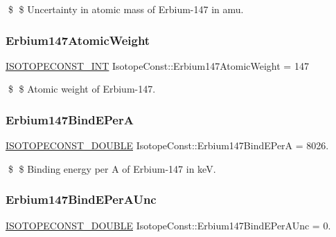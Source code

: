 \$ \$ Uncertainty in atomic mass of Erbium-\/147 in amu. \mbox{\label{group___isotope_const-_erbium-_er147_ga8aad24d3dfed998133d4e0a79999360c}} 
\subsubsection{\texorpdfstring{Erbium147\+Atomic\+Weight}{Erbium147AtomicWeight}}
{\footnotesize\ttfamily \mbox{\hyperlink{group___isotope_const-_macros_ga5f18360b3e99483a35c32d789e62621c}{I\+S\+O\+T\+O\+P\+E\+C\+O\+N\+S\+T\+\_\+\+I\+NT}} Isotope\+Const\+::\+Erbium147\+Atomic\+Weight = 147}

\$ \$ Atomic weight of Erbium-\/147. \mbox{\label{group___isotope_const-_erbium-_er147_gaaabc9afac0393ef5250c950afb202d46}} 
\subsubsection{\texorpdfstring{Erbium147\+Bind\+E\+PerA}{Erbium147BindEPerA}}
{\footnotesize\ttfamily \mbox{\hyperlink{group___isotope_const-_macros_ga8f45a7272ce02c0b4c65c44636ed719a}{I\+S\+O\+T\+O\+P\+E\+C\+O\+N\+S\+T\+\_\+\+D\+O\+U\+B\+LE}} Isotope\+Const\+::\+Erbium147\+Bind\+E\+PerA = 8026.}

\$ \$ Binding energy per A of Erbium-\/147 in keV. \mbox{\label{group___isotope_const-_erbium-_er147_ga036d0bae55e6a5c8eb222f361f6c50a3}} 
\subsubsection{\texorpdfstring{Erbium147\+Bind\+E\+Per\+A\+Unc}{Erbium147BindEPerAUnc}}
{\footnotesize\ttfamily \mbox{\hyperlink{group___isotope_const-_macros_ga8f45a7272ce02c0b4c65c44636ed719a}{I\+S\+O\+T\+O\+P\+E\+C\+O\+N\+S\+T\+\_\+\+D\+O\+U\+B\+LE}} Isotope\+Const\+::\+Erbium147\+Bind\+E\+Per\+A\+Unc = 0.}

